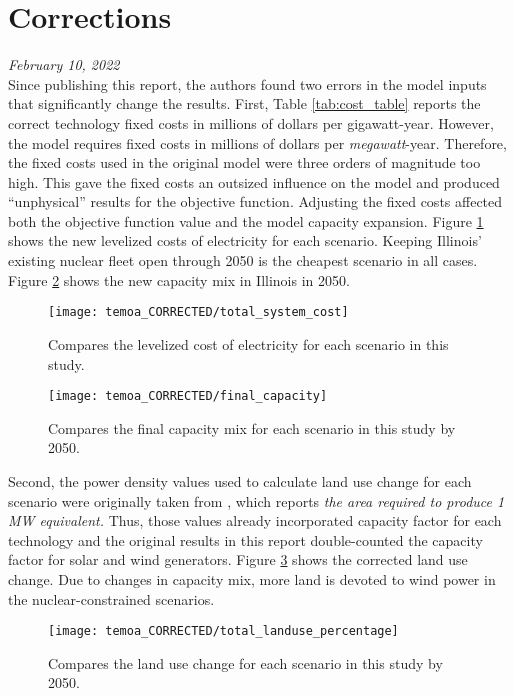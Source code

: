 \section*{Corrections}

\textit{February 10, 2022} \\

Since publishing this report, the authors found two errors in the model inputs
that significantly change the results. First, Table \ref{tab:cost_table} reports
the correct technology fixed costs in millions of dollars per gigawatt-year.
However, the model requires fixed costs in millions of dollars per \textit{megawatt}-year.
Therefore, the fixed costs used in the original model were three orders of
magnitude too high. This gave the fixed costs an outsized influence on the model
and produced ``unphysical'' results for the objective function. Adjusting
the fixed costs affected both the objective function value and the model capacity
expansion. Figure \ref{fig:system_cost} shows the new levelized costs of
electricity for each scenario. Keeping Illinois' existing nuclear fleet open
through 2050 is the cheapest scenario in all cases. Figure \ref{fig:correct_capacity_2050}
shows the new capacity mix in Illinois in 2050.

\begin{figure}[H]
  \texttt{[image: temoa\_CORRECTED/total\_system\_cost]}
  \caption{Compares the levelized cost of electricity for each scenario in this
  study.}
  \label{fig:system_cost}
\end{figure}

\begin{figure}[H]
  \texttt{[image: temoa\_CORRECTED/final\_capacity]}
  \caption{Compares the final capacity mix for each scenario in this
  study by 2050.}
  \label{fig:correct_capacity_2050}
\end{figure}

Second, the power density values used to calculate land use change for each
scenario were originally taken from \cite{van_zalk_spatial_2018}, which reports
\textit{the area required to produce 1 MW equivalent.} Thus, those values
already incorporated capacity factor for each technology and the original
results in this report double-counted the capacity factor for solar and wind
generators. Figure \ref{fig:landuse_correct} shows the corrected land use change.
Due to changes in capacity mix, more land is devoted to wind power in the nuclear-constrained
scenarios.

\begin{figure}[H]
  \texttt{[image: temoa\_CORRECTED/total\_landuse\_percentage]}
  \caption{Compares the land use change for each scenario in this
  study by 2050.}
  \label{fig:landuse_correct}
\end{figure}

